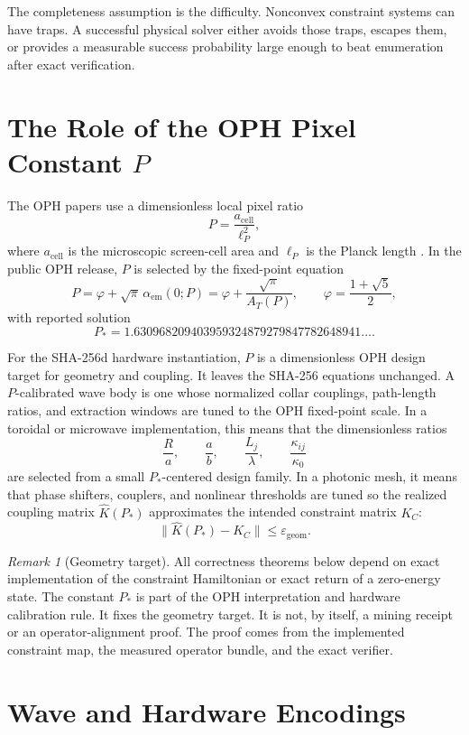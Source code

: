 \documentclass[11pt]{article}
\theoremstyle{definition}
\theoremstyle{remark}
\newtheorem{remark}[theorem]{Remark}
\begin{document}
The completeness assumption is the difficulty. Nonconvex constraint systems can
have traps. A successful physical solver either avoids those traps, escapes
them, or provides a measurable success probability large enough to beat
enumeration after exact verification.

\section{The Role of the OPH Pixel Constant \(P\)}

The OPH papers use a dimensionless local pixel ratio
\[
P=\frac{a_{\mathrm{cell}}}{\ell_P^2},
\]
where \(a_{\mathrm{cell}}\) is the microscopic screen-cell area and \(\ell_P\)
is the Planck length \cite{OPHCompactCurrent,OPHScreenCurrent}. In the public OPH
release, \(P\) is selected by the fixed-point equation
\[
P=\varphi+\sqrt{\pi}\,\alpha_{\mathrm{em}}(0;P)
=\varphi+\frac{\sqrt{\pi}}{A_T(P)},
\qquad
\varphi=\frac{1+\sqrt5}{2},
\]
with reported solution
\[
P_\ast=1.630968209403959324879279847782648941\ldots.
\]

For the SHA-256d hardware instantiation, \(P\) is a dimensionless OPH design
target for geometry and coupling. It leaves the SHA-256 equations unchanged.
A \(P\)-calibrated
wave body is one whose normalized collar couplings, path-length ratios, and
extraction windows are tuned to the OPH fixed-point scale. In a toroidal or
microwave implementation, this means that the
dimensionless ratios
\[
\frac{R}{a},\qquad
\frac{a}{b},\qquad
\frac{L_j}{\lambda},\qquad
\frac{\kappa_{ij}}{\kappa_0}
\]
are selected from a small \(P_\ast\)-centered design family. In a photonic mesh,
it means that phase shifters, couplers, and nonlinear thresholds are tuned so
the realized coupling matrix \(\widehat K(P_\ast)\) approximates the intended
constraint matrix \(K_C\):
\[
\|\widehat K(P_\ast)-K_C\|\le \varepsilon_{\mathrm{geom}}.
\]

\begin{remark}[Geometry target]
All correctness theorems below depend on exact implementation of the
constraint Hamiltonian or exact return of a zero-energy state. The constant
\(P_\ast\) is part of the OPH interpretation and hardware calibration rule.
It fixes the geometry target. It is not, by itself, a mining receipt or an
operator-alignment proof. The proof comes from the implemented constraint
map, the measured operator bundle, and the exact verifier.
\end{remark}

\section{Wave and Hardware Encodings}
\end{document}
